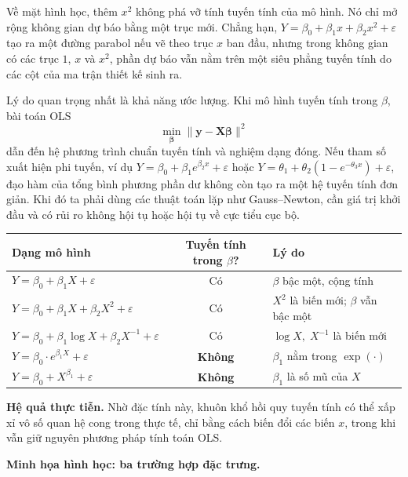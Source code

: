 Về mặt hình học, thêm $x^2$ không phá vỡ tính tuyến tính của mô hình. Nó chỉ mở rộng không gian dự báo bằng một trục mới. Chẳng hạn, $Y = \beta_0 + \beta_1 x + \beta_2 x^2 + \varepsilon$ tạo ra một đường parabol nếu vẽ theo trục $x$ ban đầu, nhưng trong không gian có các trục $1$, $x$ và $x^2$, phần dự báo vẫn nằm trên một siêu phẳng tuyến tính do các cột của ma trận thiết kế sinh ra.

Lý do quan trọng nhất là khả năng ước lượng. Khi mô hình tuyến tính trong $\beta$, bài toán OLS
\[
  \min_{\boldsymbol{\beta}} \|\mathbf{y} - \mathbf{X}\boldsymbol{\beta}\|^2
\]
dẫn đến hệ phương trình chuẩn tuyến tính và nghiệm dạng đóng. Nếu tham số xuất hiện phi tuyến, ví dụ $Y = \beta_0 + \beta_1 e^{\beta_2 x} + \varepsilon$ hoặc $Y = \theta_1 + \theta_2(1 - e^{-\theta_3 x}) + \varepsilon$, đạo hàm của tổng bình phương phần dư không còn tạo ra một hệ tuyến tính đơn giản. Khi đó ta phải dùng các thuật toán lặp như Gauss--Newton, cần giá trị khởi đầu và có rủi ro không hội tụ hoặc hội tụ về cực tiểu cục bộ.

\vspace{6pt}
\begin{center}
\small
\begin{tabularx}{\textwidth}{@{}>{\raggedright\arraybackslash}Xc>{\raggedright\arraybackslash}X@{}}
\toprule
\textbf{Dạng mô hình} & \textbf{Tuyến tính trong $\beta$?} & \textbf{Lý do} \\
\midrule
$Y = \beta_0 + \beta_1 X + \varepsilon$ & Có & $\beta$ bậc một, cộng tính \\
$Y = \beta_0 + \beta_1 X + \beta_2 X^2 + \varepsilon$ & Có & $X^2$ là biến mới; $\beta$ vẫn bậc một \\
$Y = \beta_0 + \beta_1 \log X + \beta_2 X^{-1} + \varepsilon$ & Có & $\log X,\; X^{-1}$ là biến mới \\
$Y = \beta_0 \cdot e^{\beta_1 X} + \varepsilon$ & \textbf{Không} & $\beta_1$ nằm trong $\exp(\cdot)$ \\
$Y = \beta_0 + X^{\beta_1} + \varepsilon$ & \textbf{Không} & $\beta_1$ là số mũ của $X$ \\
\bottomrule
\end{tabularx}
\end{center}

\textbf{Hệ quả thực tiễn.} Nhờ đặc tính này, khuôn khổ hồi quy tuyến tính có thể xấp xỉ vô số quan hệ cong trong thực tế, chỉ bằng cách biến đổi các biến $x$, trong khi vẫn giữ nguyên phương pháp tính toán OLS.

\textbf{Minh họa hình học: ba trường hợp đặc trưng.}

